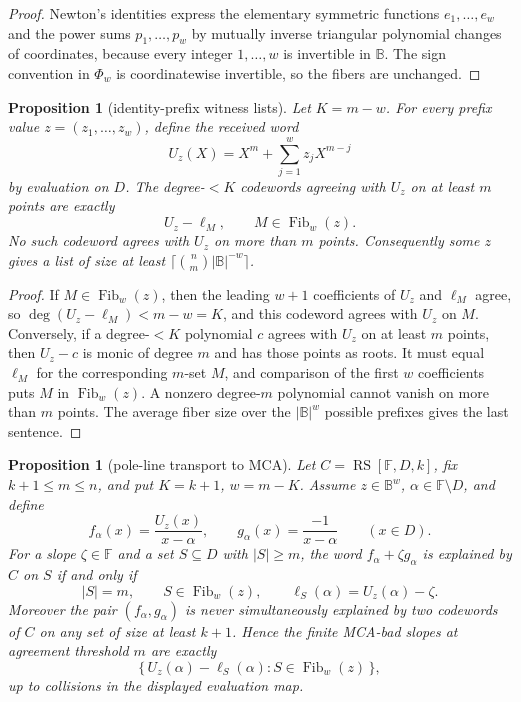 \documentclass[a4paper,11pt]{amsart}
\newtheorem{proposition}[theorem]{Proposition}
\theoremstyle{remark}
\newcommand{\F}{\mathbb F}
\newcommand{\B}{\mathbb B}
\newcommand{\RS}{\operatorname{RS}}
\newcommand{\Fib}{\operatorname{Fib}}
\begin{document}
\begin{proof}
Newton's identities express the elementary symmetric functions \(e_1,\ldots,e_w\) and the power sums \(p_1,\ldots,p_w\) by mutually inverse triangular polynomial changes of coordinates, because every integer \(1,\ldots,w\) is invertible in \(\B\).  The sign convention in \(\Phi_w\) is coordinatewise invertible, so the fibers are unchanged.
\end{proof}

\begin{proposition}[identity-prefix witness lists]\label{prop:prefix-witness}
Let \(K=m-w\).  For every prefix value \(z=(z_1,\ldots,z_w)\), define the received word
\[
        U_z(X)=X^m+\sum_{j=1}^{w}z_jX^{m-j}
\]
by evaluation on \(D\).  The degree-\(<K\) codewords agreeing with \(U_z\) on at least \(m\) points are exactly
\[
        U_z-\ell_M,\qquad M\in\Fib_w(z).
\]
No such codeword agrees with \(U_z\) on more than \(m\) points.  Consequently some \(z\) gives a list of size at least \(\lceil \binom{n}{m}|\B|^{-w}\rceil\).
\end{proposition}

\begin{proof}
If \(M\in\Fib_w(z)\), then the leading \(w+1\) coefficients of \(U_z\) and \(\ell_M\) agree, so \(\deg(U_z-\ell_M)<m-w=K\), and this codeword agrees with \(U_z\) on \(M\).  Conversely, if a degree-\(<K\) polynomial \(c\) agrees with \(U_z\) on at least \(m\) points, then \(U_z-c\) is monic of degree \(m\) and has those points as roots.  It must equal \(\ell_M\) for the corresponding \(m\)-set \(M\), and comparison of the first \(w\) coefficients puts \(M\) in \(\Fib_w(z)\).  A nonzero degree-\(m\) polynomial cannot vanish on more than \(m\) points.  The average fiber size over the \(|\B|^w\) possible prefixes gives the last sentence.
\end{proof}

\begin{proposition}[pole-line transport to MCA]\label{prop:pole-line}
Let \(C=\RS[\F,D,k]\), fix \(k+1\le m\le n\), and put \(K=k+1\), \(w=m-K\).  Assume \(z\in\B^w\), \(\alpha\in\F\setminus D\), and define
\[
        f_\alpha(x)=\frac{U_z(x)}{x-\alpha},
        \qquad
        g_\alpha(x)=\frac{-1}{x-\alpha}\qquad(x\in D).
\]
For a slope \(\zeta\in\F\) and a set \(S\subseteq D\) with \(|S|\ge m\), the word \(f_\alpha+\zeta g_\alpha\) is explained by \(C\) on \(S\) if and only if
\[
        |S|=m,\qquad S\in\Fib_w(z),\qquad
        \ell_S(\alpha)=U_z(\alpha)-\zeta .
\]
Moreover the pair \((f_\alpha,g_\alpha)\) is never simultaneously explained by two codewords of \(C\) on any set of size at least \(k+1\).  Hence the finite MCA-bad slopes at agreement threshold \(m\) are exactly
\[
        \bigl\{\,U_z(\alpha)-\ell_S(\alpha):S\in\Fib_w(z)\,\bigr\},
\]
up to collisions in the displayed evaluation map.
\end{proposition}
\end{document}
